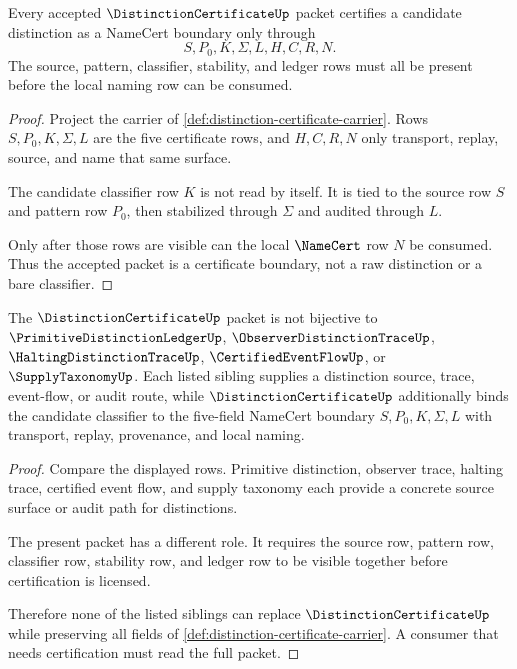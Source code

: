 \begin{theorem}
\label{thm:distinction-certificate-namecert-boundary}
Every accepted $\DistinctionCertificateUp$ packet certifies a candidate distinction as a NameCert boundary only through
$$
S,P_0,K,\Sigma,L,H,C,R,N .
$$
The source, pattern, classifier, stability, and ledger rows must all be present before the local naming row can be consumed.
\end{theorem}
\begin{proof}
Project the carrier of \autoref{def:distinction-certificate-carrier}. Rows $S,P_0,K,\Sigma,L$ are the five certificate rows, and $H,C,R,N$ only transport, replay, source, and name that same surface.

The candidate classifier row $K$ is not read by itself. It is tied to the source row $S$ and pattern row $P_0$, then stabilized through $\Sigma$ and audited through $L$.

Only after those rows are visible can the local $\NameCert$ row $N$ be consumed. Thus the accepted packet is a certificate boundary, not a raw distinction or a bare classifier.
\end{proof}

\begin{theorem}
\label{thm:distinction-certificate-sibling-separation}
The $\DistinctionCertificateUp$ packet is not bijective to $\PrimitiveDistinctionLedgerUp$, $\ObserverDistinctionTraceUp$, $\HaltingDistinctionTraceUp$, $\CertifiedEventFlowUp$, or $\SupplyTaxonomyUp$. Each listed sibling supplies a distinction source, trace, event-flow, or audit route, while $\DistinctionCertificateUp$ additionally binds the candidate classifier to the five-field NameCert boundary $S,P_0,K,\Sigma,L$ with transport, replay, provenance, and local naming.
\end{theorem}
\begin{proof}
Compare the displayed rows. Primitive distinction, observer trace, halting trace, certified event flow, and supply taxonomy each provide a concrete source surface or audit path for distinctions.

The present packet has a different role. It requires the source row, pattern row, classifier row, stability row, and ledger row to be visible together before certification is licensed.

Therefore none of the listed siblings can replace $\DistinctionCertificateUp$ while preserving all fields of \autoref{def:distinction-certificate-carrier}. A consumer that needs certification must read the full packet.
\end{proof}

